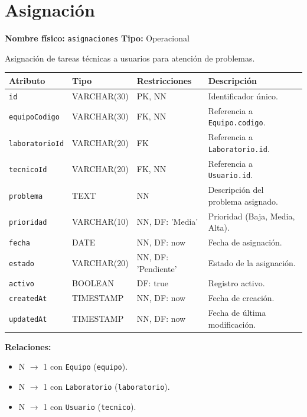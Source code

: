\documentclass[12pt,a4paper]{article}
\newenvironment{tabladesc}[3]{%
  \section{#1}
  \textbf{Nombre físico:} \texttt{#2} \hfill \textbf{Tipo:} #3\par
  \medskip
}{%
  \bigskip
}
\begin{document}
\begin{tabladesc}{Asignación}{asignaciones}{Operacional}

Asignación de tareas técnicas a usuarios para atención de problemas.

\bigskip
\begin{longtable}{L{3.5cm} L{2.5cm} L{2cm} L{7.5cm}}
\toprule
\textbf{Atributo} & \textbf{Tipo} & \textbf{Restricciones} & \textbf{Descripción} \\
\midrule
\endhead
\bottomrule
\endfoot
\texttt{id}          & VARCHAR(30)  & PK, NN & Identificador único. \\
\texttt{equipoCodigo}& VARCHAR(30)  & FK, NN & Referencia a \texttt{Equipo.codigo}. \\
\texttt{laboratorioId}& VARCHAR(20) & FK     & Referencia a \texttt{Laboratorio.id}. \\
\texttt{tecnicoId}   & VARCHAR(20)  & FK, NN & Referencia a \texttt{Usuario.id}. \\
\texttt{problema}    & TEXT         & NN     & Descripción del problema asignado. \\
\texttt{prioridad}   & VARCHAR(10)  & NN, DF: 'Media' & Prioridad (Baja, Media, Alta). \\
\texttt{fecha}       & DATE         & NN, DF: now & Fecha de asignación. \\
\texttt{estado}      & VARCHAR(20)  & NN, DF: 'Pendiente' & Estado de la asignación. \\
\texttt{activo}      & BOOLEAN      & DF: true & Registro activo. \\
\texttt{createdAt}   & TIMESTAMP    & NN, DF: now & Fecha de creación. \\
\texttt{updatedAt}   & TIMESTAMP    & NN, DF: now & Fecha de última modificación. \\
\bottomrule
\end{longtable}

\textbf{Relaciones:}
\begin{itemize}[nosep]
  \item N $\rightarrow$ 1 con \texttt{Equipo} (\texttt{equipo}).
  \item N $\rightarrow$ 1 con \texttt{Laboratorio} (\texttt{laboratorio}).
  \item N $\rightarrow$ 1 con \texttt{Usuario} (\texttt{tecnico}).
\end{itemize}
\end{tabladesc}
\end{document}
